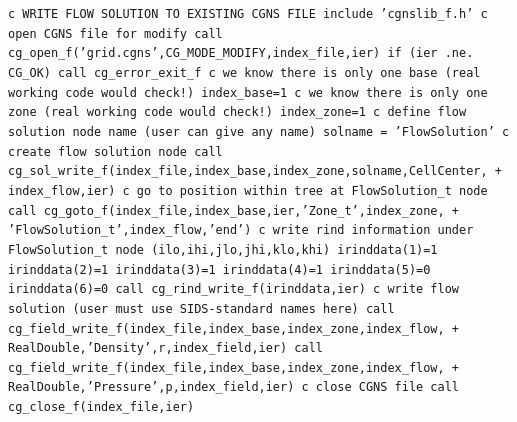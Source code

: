 \documentclass[12pt]{article}
\begin{document}
{\tt \noindent c  WRITE FLOW SOLUTION TO EXISTING CGNS FILE
\newline\indent      include 'cgnslib\_f.h'
\newline c  open CGNS file for modify
\newline\indent      call cg\_open\_f('grid.cgns',CG\_MODE\_MODIFY,index\_file,ier)
\newline\indent      if (ier .ne. CG\_OK) call cg\_error\_exit\_f
\newline c  we know there is only one base (real working code would check!)
\newline\indent      index\_base=1
\newline c  we know there is only one zone (real working code would check!)
\newline\indent      index\_zone=1
\newline c  define flow solution node name (user can give any name)
\newline\indent      solname = 'FlowSolution'
\newline c  create flow solution node
\newline\indent      call cg\_sol\_write\_f(index\_file,index\_base,index\_zone,solname,CellCenter,
\newline + \indent index\_flow,ier)
\newline c  go to position within tree at FlowSolution\_t node
\newline\indent      call cg\_goto\_f(index\_file,index\_base,ier,'Zone\_t',index\_zone,
\newline + \indent 'FlowSolution\_t',index\_flow,'end')
\newline c   write rind information under FlowSolution\_t node (ilo,ihi,jlo,jhi,klo,khi)
\newline\indent      irinddata(1)=1
\newline\indent      irinddata(2)=1
\newline\indent      irinddata(3)=1
\newline\indent      irinddata(4)=1
\newline\indent      irinddata(5)=0
\newline\indent      irinddata(6)=0
\newline\indent      call cg\_rind\_write\_f(irinddata,ier)
\newline c  write flow solution (user must use SIDS-standard names here)
\newline\indent      call cg\_field\_write\_f(index\_file,index\_base,index\_zone,index\_flow,
\newline + \indent RealDouble,'Density',r,index\_field,ier)
\newline\indent      call cg\_field\_write\_f(index\_file,index\_base,index\_zone,index\_flow,
\newline + \indent RealDouble,'Pressure',p,index\_field,ier)
\newline c  close CGNS file
\newline\indent      call cg\_close\_f(index\_file,ier)}
\end{document}
